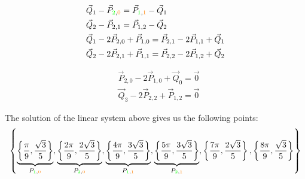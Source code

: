 $$
\begin{aligned}
&\vec{Q}_1-\vec{P}_{\textcolor{green}{2},\textcolor{orange}{0}}=\vec{P}_{\textcolor{green}{1},\textcolor{orange}{1}}-\vec{Q}_1 \\
&\vec{Q}_2-\vec{P}_{2,1}=\vec{P}_{1,2}-\vec{Q}_2 \\
&\vec{Q}_1-2 \vec{P}_{2,0}+\vec{P}_{1,0}=\vec{P}_{2,1}-2 \vec{P}_{1,1}+\vec{Q}_1 \\
&\vec{Q}_2-2 \vec{P}_{2,1}+\vec{P}_{1,1}=\vec{P}_{2,2}-2 \vec{P}_{1,2}+\vec{Q}_2
\end{aligned}
$$

$$
\begin{aligned}
&\vec{P}_{2,0}-2 \vec{P}_{1,0}+\vec{Q}_0=\overrightarrow{0} \\
&\vec{Q}_3-2 \vec{P}_{2,2}+\vec{P}_{1,2}=\overrightarrow{0}
\end{aligned}
$$

The solution of the linear system above gives us the following points:
$$
\left\{\underbrace{\left\{\frac{\pi}{9}, \frac{\sqrt{3}}{5}\right\}}_{P_{\textcolor{green}{1}, \textcolor{orange}{0}}},\underbrace{\left\{\frac{2 \pi}{9}, \frac{2 \sqrt{3}}{5}\right\}}_{P_{\textcolor{green}{2}, \textcolor{orange}{0}}},\underbrace{\left\{\frac{4 \pi}{9}, \frac{3 \sqrt{3}}{5}\right\}}_{P_{\textcolor{green}{1}, \textcolor{orange}{1}}},\underbrace{\left\{\frac{5 \pi}{9}, \frac{3 \sqrt{3}}{5}\right\}}_{P_{\textcolor{green}{2}, \textcolor{orange}{1}}},\left\{\frac{7 \pi}{9}, \frac{2 \sqrt{3}}{5}\right\},\left\{\frac{8 \pi}{9}, \frac{\sqrt{3}}{5}\right\}\right\}
$$

